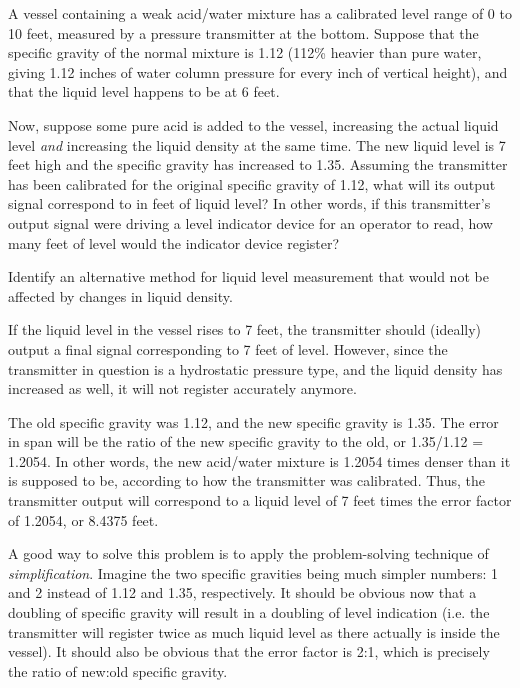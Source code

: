 

A vessel containing a weak acid/water mixture has a calibrated level range of 0 to 10 feet, measured by a pressure transmitter at the bottom.  Suppose that the specific gravity of the normal mixture is 1.12 (112\% heavier than pure water, giving 1.12 inches of water column pressure for every inch of vertical height), and that the liquid level happens to be at 6 feet.

Now, suppose some pure acid is added to the vessel, increasing the actual liquid level {\it and} increasing the liquid density at the same time.  The new liquid level is 7 feet high and the specific gravity has increased to 1.35.  Assuming the transmitter has been calibrated for the original specific gravity of 1.12, what will its output signal correspond to in feet of liquid level?  In other words, if this transmitter's output signal were driving a level indicator device for an operator to read, how many feet of level would the indicator device register?

\vskip 10pt

Identify an alternative method for liquid level measurement that would not be affected by changes in liquid density.







If the liquid level in the vessel rises to 7 feet, the transmitter should (ideally) output a final signal corresponding to 7 feet of level.  However, since the transmitter in question is a hydrostatic pressure type, and the liquid density has increased as well, it will not register accurately anymore.

The old specific gravity was 1.12, and the new specific gravity is 1.35.  The error in span will be the ratio of the new specific gravity to the old, or 1.35/1.12 = 1.2054.  In other words, the new acid/water mixture is 1.2054 times denser than it is supposed to be, according to how the transmitter was calibrated.  Thus, the transmitter output will correspond to a liquid level of 7 feet times the error factor of 1.2054, or 8.4375 feet.

\vskip 10pt

A good way to solve this problem is to apply the problem-solving technique of {\it simplification}.  Imagine the two specific gravities being much simpler numbers: 1 and 2 instead of 1.12 and 1.35, respectively.  It should be obvious now that a doubling of specific gravity will result in a doubling of level indication (i.e. the transmitter will register twice as much liquid level as there actually is inside the vessel).  It should also be obvious that the error factor is 2:1, which is precisely the ratio of new:old specific gravity.

